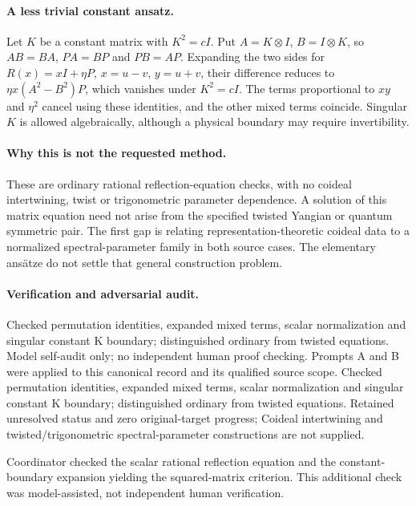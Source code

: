 \documentclass[11pt]{article}
\begin{document}
\paragraph{A less trivial constant ansatz.} Let $K$ be a constant matrix with $K^2=cI$. Put $A=K\otimes I$, $B=I\otimes K$, so $AB=BA$, $PA=BP$ and $PB=AP$. Expanding the two sides for $R(x)=xI+\eta P$, $x=u-v$, $y=u+v$, their difference reduces to $\eta x(A^2-B^2)P$, which vanishes under $K^2=cI$. The terms proportional to $xy$ and $\eta^2$ cancel using these identities, and the other mixed terms coincide. Singular $K$ is allowed algebraically, although a physical boundary may require invertibility.

\paragraph{Why this is not the requested method.} These are ordinary rational reflection-equation checks, with no coideal intertwining, twist or trigonometric parameter dependence. A solution of this matrix equation need not arise from the specified twisted Yangian or quantum symmetric pair. The first gap is relating representation-theoretic coideal data to a normalized spectral-parameter family in both source cases. The elementary ansätze do not settle that general construction problem.

\paragraph{Verification and adversarial audit.}
Checked permutation identities, expanded mixed terms, scalar normalization and singular constant K boundary; distinguished ordinary from twisted equations. Model self-audit only; no independent human proof checking. Prompts A and B were applied to this canonical record and its qualified source scope. Checked permutation identities, expanded mixed terms, scalar normalization and singular constant K boundary; distinguished ordinary from twisted equations. Retained unresolved status and zero original-target progress; Coideal intertwining and twisted/trigonometric spectral-parameter constructions are not supplied.

Coordinator checked the scalar rational reflection equation and the constant-boundary expansion yielding the squared-matrix criterion. This additional check was model-assisted, not independent human verification.
\end{document}
